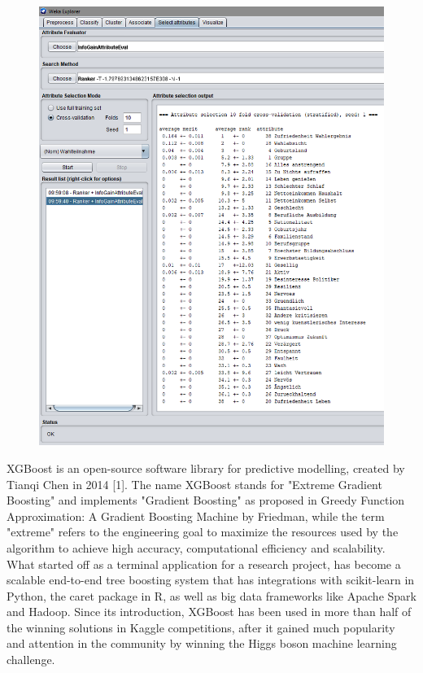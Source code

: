 \begin{figure}[ht]
	\begin{center}
		\includegraphics[scale=0.55,angle=0]{fig/weka_gbs}
	\end{center}
\end{figure}

XGBoost is an open-source software library for predictive modelling, created by Tianqi Chen in 2014 [1]. The name XGBoost stands for "Extreme Gradient Boosting" and implements "Gradient Boosting" as proposed in Greedy Function Approximation: A Gradient Boosting Machine by Friedman, while the term "extreme" refers to the engineering goal to maximize the resources used by the algorithm to achieve high accuracy, computational efficiency and scalability. What started off as a terminal application for a research project, has become a scalable end-to-end tree boosting system that has integrations with scikit-learn in Python, the caret package in R, as well as big data frameworks like Apache Spark and Hadoop. Since its introduction, XGBoost has been used in more than half of the winning solutions in Kaggle competitions, after it gained much popularity and attention in the community by winning the Higgs boson machine learning challenge.
